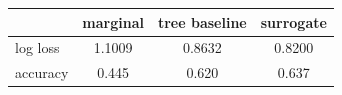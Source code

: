 \begin{tabular}{lccc}
\toprule
 & marginal & tree baseline & surrogate \\
\midrule
log loss & 1.1009 & 0.8632 & 0.8200 \\
accuracy & 0.445 & 0.620 & 0.637 \\
\bottomrule
\end{tabular}
